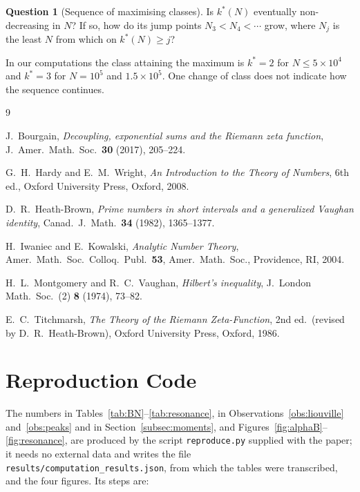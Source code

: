\documentclass[11pt]{amsart}
\theoremstyle{definition}
\newtheorem{question}[theorem]{Question}
\theoremstyle{remark}
\begin{document}
\begin{question}[Sequence of maximising classes]\label{conj:transitions}
Is $k^*(N)$ eventually non-decreasing in $N$?  If so, how do its jump
points $N_3 < N_4 < \cdots$ grow, where $N_j$ is the least $N$ from which
on $k^*(N)\ge j$?
\end{question}

In our computations the class attaining the maximum is $k^*=2$ for
$N\le5\times10^4$ and $k^*=3$ for $N=10^5$ and $1.5\times10^5$.  One
change of class does not indicate how the sequence continues.

\begin{thebibliography}{9}

J.~Bourgain, \emph{Decoupling, exponential sums and the Riemann
zeta function}, J.~Amer.\ Math.\ Soc.\ \textbf{30} (2017), 205--224.

G.~H.~Hardy and E.~M.~Wright,
\emph{An Introduction to the Theory of Numbers},
6th ed., Oxford University Press, Oxford, 2008.

D.~R.~Heath-Brown, \emph{Prime numbers in short intervals and a
generalized Vaughan identity},
Canad.\ J.~Math.\ \textbf{34} (1982), 1365--1377.

H.~Iwaniec and E.~Kowalski,
\emph{Analytic Number Theory},
Amer.\ Math.\ Soc.\ Colloq.\ Publ.\ \textbf{53},
Amer.\ Math.\ Soc., Providence, RI, 2004.

H.~L.~Montgomery and R.~C.~Vaughan,
\emph{Hilbert's inequality},
J.~London Math.\ Soc.\ (2) \textbf{8} (1974), 73--82.

E.~C.~Titchmarsh,
\emph{The Theory of the Riemann Zeta-Function},
2nd ed.\ (revised by D.~R.~Heath-Brown), Oxford University Press,
Oxford, 1986.

\end{thebibliography}

\appendix
\section{Reproduction Code}\label{app:code}

The numbers in Tables~\ref{tab:BN}--\ref{tab:resonance}, in
Observations~\ref{obs:liouville} and~\ref{obs:peaks} and in
Section~\ref{subsec:moments}, and
Figures~\ref{fig:alphaB}--\ref{fig:resonance}, are produced by
the script \texttt{reproduce.py} supplied with the paper; it needs no
external data and writes the file
\texttt{results/computation\_results.json}, from which the tables were
transcribed, and the four figures.  Its steps are:
\end{document}
